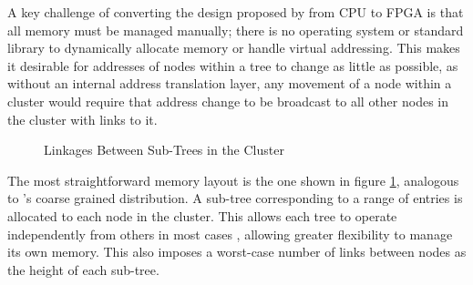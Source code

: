 
A key challenge of converting the design proposed by \citeauthor{base} from CPU
to FPGA is that all memory must be managed manually; there is no operating
system or standard library to dynamically allocate memory or handle virtual
addressing. This makes it desirable for addresses of nodes within a tree to
change as little as possible, as without an internal address translation layer,
any movement of a node within a cluster would require that address change to be
broadcast to all other nodes in the cluster with links to it.

\newcommand{\clusternode}[1]{
	\draw ({(#1)*6}, 0) ++(-2.75, 0.5) rectangle ++(5.5, -3);
	\node[tree] at ({(#1)*6}, 0) (n#1 00) {};
	\foreach \r [
		evaluate = \r as \w using int(3^\r),
		evaluate = \r as \wl using int(3^\r-1)
	] in {1,...,2} {
		\foreach \c [
			evaluate = \c as \i using int((\w-1)/2 + \c-1),
			evaluate = \c as \pr using int(\r-1),
			evaluate = \c as \pc using int(\c/3),
			evaluate = \c as \cl using int(\c-1)
		] in {0,...,\wl} {
			\node[tree] (n#1 \r\c)
				at ({(#1)*6 + (\c-int(\w/2)) / (\w/5)}, -\r) {};
			\draw[->] (n#1 \pr\pc) -- (n#1 \r\c);
			\ifthenelse{\c=0}{}{
				\draw[->] (n#1 \r\cl) -- (n#1 \r\c);
			}
		}
	}
}

\begin{figure}
	\centering
	\caption{Linkages Between Sub-Trees in the Cluster}
\label{coarse-link}
\end{figure}

The most straightforward memory layout is the one shown in figure
\ref{coarse-link}, analogous to \citeauthor{base}'s coarse grained distribution.
A sub-tree corresponding to a range of entries is allocated to each node in the
cluster. This allows each tree to operate independently from others in most
cases \autocite{ma-tpds-2022}, allowing greater flexibility to manage its own
memory. This also imposes a worst-case number of links between nodes as the
height of each sub-tree.
